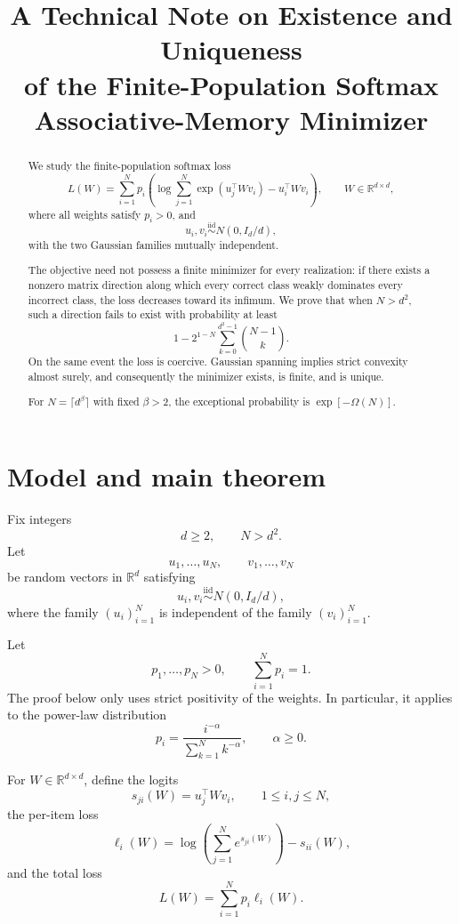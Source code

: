 \documentclass[11pt]{article}
\title{
A Technical Note on Existence and Uniqueness\\
of the Finite-Population Softmax Associative-Memory Minimizer
}
\author{}
\date{}
\newcommand{\R}{\mathbb{R}}
\newcommand{\1}{\mathbf{1}}
\begin{document}
\maketitle

\begin{abstract}
We study the finite-population softmax loss
\[
L(W)
=
\sum_{i=1}^{N}p_i
\left(
\log\sum_{j=1}^{N}
\exp(u_j^\top Wv_i)
-
u_i^\top Wv_i
\right),
\qquad
W\in\R^{d\times d},
\]
where all weights satisfy \(p_i>0\), and
\[
u_i,v_i\overset{\mathrm{iid}}{\sim}N(0,I_d/d),
\]
with the two Gaussian families mutually independent.

The objective need not possess a finite minimizer for every realization:
if there exists a nonzero matrix direction along which every correct class
weakly dominates every incorrect class, the loss decreases toward its
infimum. We prove that when \(N>d^2\), such a
direction fails to exist with probability at least
\[
1-
2^{1-N}
\sum_{k=0}^{d^2-1}
\binom{N-1}{k}.
\]
On the same event the loss is coercive. Gaussian spanning implies strict
convexity almost surely, and consequently the minimizer exists, is finite,
and is unique.

For \(N=\lceil d^\beta\rceil\) with fixed \(\beta>2\), the exceptional
probability is \(\exp[-\Omega(N)]\).
\end{abstract}

\tableofcontents

\section{Model and main theorem}

Fix integers
\[
d\ge 2,
\qquad
N>d^2.
\]
Let
\[
u_1,\dots,u_N,
\qquad
v_1,\dots,v_N
\]
be random vectors in \(\R^d\) satisfying
\[
u_i,v_i\overset{\mathrm{iid}}{\sim}N(0,I_d/d),
\]
where the family \((u_i)_{i=1}^N\) is independent of the family
\((v_i)_{i=1}^N\).

Let
\[
p_1,\dots,p_N>0,
\qquad
\sum_{i=1}^N p_i=1.
\]
The proof below only uses strict positivity of the weights. In particular,
it applies to the power-law distribution
\[
p_i
=
\frac{i^{-\alpha}}
{\sum_{k=1}^N k^{-\alpha}},
\qquad
\alpha\ge 0.
\]

For \(W\in\R^{d\times d}\), define the logits
\[
s_{ji}(W)=u_j^\top Wv_i,
\qquad
1\le i,j\le N,
\]
the per-item loss
\[
\ell_i(W)
=
\log\left(
\sum_{j=1}^{N}e^{s_{ji}(W)}
\right)
-
s_{ii}(W),
\]
and the total loss
\[
L(W)
=
\sum_{i=1}^{N}p_i\ell_i(W).
\]
\end{document}
